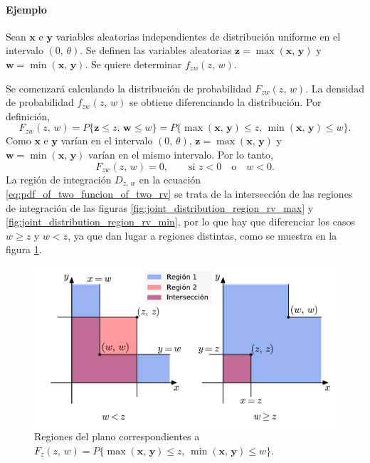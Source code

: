 \documentclass[a4paper]{report}
\newcommand{\x}{\mathbf{x}}
\newcommand{\y}{\mathbf{y}}
\newcommand{\w}{\mathbf{w}}
\newcommand{\z}{\mathbf{z}}
\begin{document}
\paragraph{Ejemplo} Sean \(\x\) e \(\y\) variables aleatorias independientes de distribución uniforme en el intervalo \((0,\,\theta)\). Se definen las variables aleatorias \(\z=\max(\x,\,\y)\) y \(\w=\min(\x,\,\y)\). Se quiere determinar \(f_{zw}(z,\,w)\).

Se comenzará calculando la distribución de probabilidad \(F_{zw}(z,\,w)\). La densidad de probabilidad \(f_{zw}(z,\,w)\) se obtiene diferenciando la distribución. Por definición,
\[
 F_{zw}(z,\,w)=P\{\z\leq z,\,\w\leq w\}=P\{\max(\x,\,\y)\leq z,\,\min(\x,\,\y)\leq w\}.
\]
Como \(\x\) e \(\y\) varían en el intervalo \((0,\,\theta)\), \(\z=\max(\x,\,\y)\) y \(\w=\min(\x,\,\y)\) varían en el mismo intervalo. Por lo tanto,
\[
 F_{zw}(z,\,w)=0, \qquad\textrm{si }z<0\quad\textrm{o}\quad w<0.
\]
La región de integración \(D_{z,\,w}\) en la ecuación \ref{eq:pdf_of_two_funcion_of_two_rv} se trata de la intersección de las regiones de integración de las figuras \ref{fig:joint_distribution_region_rv_max} y \ref{fig:joint_distribution_region_rv_min}, por lo que hay que diferenciar los casos \(w\geq z\) y \(w<z\), ya que dan lugar a regiones distintas, como se muestra en la figura \ref{fig:joint_distribution_region_rv_min_max}.
\begin{figure}[!htb]
\begin{center}
 \includegraphics[width=0.70\columnwidth]{figuras/joint_distribution_region_rv_min_max.pdf}
\caption{\label{fig:joint_distribution_region_rv_min_max} Regiones del plano correspondientes a \(F_z(z,\,w)=P\{\max(\x,\,\y)\leq z,\,\min(\x,\,\y)\leq w\}\).}
\end{center}
\end{figure}
\end{document}
